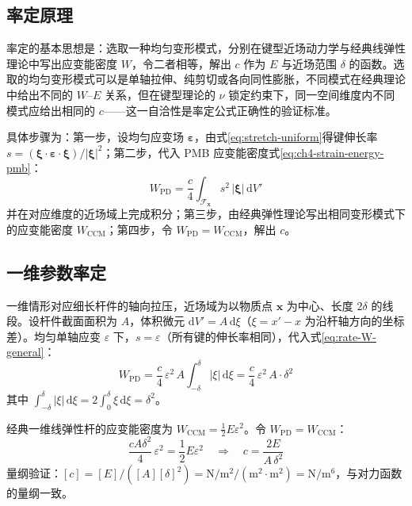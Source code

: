 \subsection{率定原理}

率定的基本思想是：选取一种均匀变形模式，分别在键型近场动力学与经典线弹性理论中写出应变能密度 $W$，令二者相等，解出 $c$ 作为 $E$ 与近场范围 $\delta$ 的函数。选取的均匀变形模式可以是单轴拉伸、纯剪切或各向同性膨胀，不同模式在经典理论中给出不同的 $W$--$E$ 关系，但在键型理论的 $\nu$ 锁定约束下，同一空间维度内不同模式应给出相同的 $c$——这一自洽性是率定公式正确性的验证标准。

具体步骤为：第一步，设均匀应变场 $\boldsymbol{\varepsilon}$，由式\eqref{eq:stretch-uniform}得键伸长率 $s=(\boldsymbol{\xi}\cdot\boldsymbol{\varepsilon}\cdot\boldsymbol{\xi})/|\boldsymbol{\xi}|^{2}$；第二步，代入 PMB 应变能密度式\eqref{eq:ch4-strain-energy-pmb}：
\begin{equation}
W_{\mathrm{PD}} = \frac{c}{4}\int_{\mathcal{F}_{\mathbf{x}}} s^{2}\,|\boldsymbol{\xi}|\,\mathrm{d}V'
\label{eq:rate-W-general}
\end{equation}
并在对应维度的近场域上完成积分；第三步，由经典弹性理论写出相同变形模式下的应变能密度 $W_{\mathrm{CCM}}$；第四步，令 $W_{\mathrm{PD}}=W_{\mathrm{CCM}}$，解出 $c$。

\subsection{一维参数率定}

一维情形对应细长杆件的轴向拉压，近场域为以物质点 $\mathbf{x}$ 为中心、长度 $2\delta$ 的线段。设杆件截面面积为 $A$，体积微元 $\mathrm{d}V'=A\,\mathrm{d}\xi$（$\xi=x'-x$ 为沿杆轴方向的坐标差）。均匀单轴应变 $\varepsilon$ 下，$s=\varepsilon$（所有键的伸长率相同），代入式\eqref{eq:rate-W-general}：
\begin{equation}
W_{\mathrm{PD}} = \frac{c}{4}\,\varepsilon^{2}\,A\int_{-\delta}^{\delta} |\xi|\,\mathrm{d}\xi
= \frac{c}{4}\,\varepsilon^{2}\,A\cdot\delta^{2}
\label{eq:rate-1d-W}
\end{equation}
其中 $\int_{-\delta}^{\delta}|\xi|\,\mathrm{d}\xi=2\int_{0}^{\delta}\xi\,\mathrm{d}\xi=\delta^{2}$。

经典一维线弹性杆的应变能密度为 $W_{\mathrm{CCM}}=\tfrac{1}{2}E\varepsilon^{2}$。令 $W_{\mathrm{PD}}=W_{\mathrm{CCM}}$：
\begin{equation}
\frac{c A\delta^{2}}{4}\,\varepsilon^{2} = \frac{1}{2}E\varepsilon^{2}
\quad\Longrightarrow\quad
c = \frac{2E}{A\,\delta^{2}}
\label{eq:rate-1d}
\end{equation}
量纲验证：$[c]=[E]/([A][\delta]^{2})=\mathrm{N}/\mathrm{m}^{2}/(\mathrm{m}^{2}\cdot\mathrm{m}^{2})=\mathrm{N}/\mathrm{m}^{6}$，与对力函数的量纲一致。

